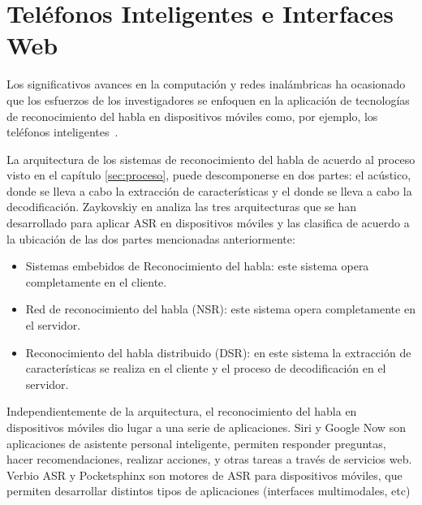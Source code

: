 \section{Tel\'efonos Inteligentes e Interfaces Web}
\label{sec:smartphones}

Los significativos avances en la computaci\'on y redes inal\'ambricas ha ocasionado
que los esfuerzos de los investigadores se enfoquen en la aplicaci\'on de tecnolog\'ias de
reconocimiento del habla en dispositivos m\'oviles como, por ejemplo, los tel\'efonos 
\mbox{inteligentes \cite{TanAutomatic2008}}.

La arquitectura de los sistemas de reconocimiento del habla de acuerdo al proceso visto en el cap\'itulo \ref{sec:proceso},
puede descomponerse en dos partes: el  ac\'ustico, donde se lleva a cabo
la extracci\'on de caracter\'isticas  y el  donde se lleva a cabo la decodificaci\'on. 
Zaykovskiy en \cite{ZaykovskiySurvey2006} analiza las tres arquitecturas que se han desarrollado
para aplicar ASR en dispositivos m\'oviles y las clasifica de acuerdo a la ubicaci\'on de las dos partes
mencionadas anteriormente:

\begin{itemize}
    \item Sistemas embebidos de Reconocimiento del habla: este sistema opera completamente en el cliente.
    \item Red de reconocimiento del habla (NSR): este sistema opera completamente en el servidor. 
    \item Reconocimiento del habla distribuido (DSR): en este sistema la extracci\'on de caracter\'isticas se realiza
        en el cliente y el proceso de decodificaci\'on en el servidor.
\end{itemize}

Independientemente de la arquitectura, el reconocimiento del habla en dispositivos m\'oviles dio lugar a una 
serie de aplicaciones. Siri \cite{AppleSiri, OneAccordSiri} y Google Now \cite{GoogleNow} 
son aplicaciones de asistente personal inteligente, permiten responder preguntas,
hacer recomendaciones, realizar acciones, y otras tareas a trav\'es de servicios web. Verbio ASR \cite{VerbioASR} y 
Pocketsphinx \cite{HugginsDainesPocketSphinx2006, PocketSphinxHomePage} son motores de ASR para dispositivos
m\'oviles, que permiten desarrollar distintos tipos de aplicaciones (interfaces multimodales, etc)


